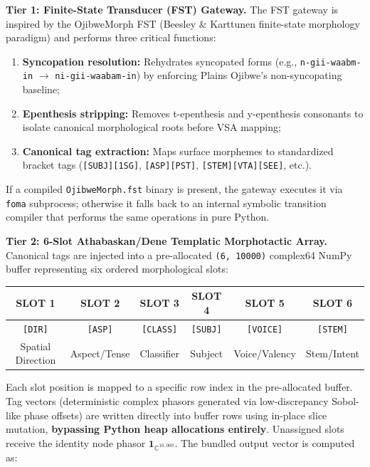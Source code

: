 \documentclass[11pt]{article}
\begin{document}
\textbf{Tier 1: Finite-State Transducer (FST) Gateway.} The FST gateway is inspired by the OjibweMorph FST (Beesley \& Karttunen finite-state morphology paradigm) and performs three critical functions:
\begin{enumerate}[label=(\alph*)]
    \item \textbf{Syncopation resolution:} Rehydrates syncopated forms (e.g., \texttt{n-gii-waabm-in} $\rightarrow$ \texttt{ni-gii-waabam-in}) by enforcing Plains Ojibwe's non-syncopating baseline;
    \item \textbf{Epenthesis stripping:} Removes t-epenthesis and y-epenthesis consonants to isolate canonical morphological roots before VSA mapping;
    \item \textbf{Canonical tag extraction:} Maps surface morphemes to standardized bracket tags (\texttt{[SUBJ][1SG]}, \texttt{[ASP][PST]}, \texttt{[STEM][VTA][SEE]}, etc.).
\end{enumerate}
If a compiled \texttt{OjibweMorph.fst} binary is present, the gateway executes it via \texttt{foma} subprocess; otherwise it falls back to an internal symbolic transition compiler that performs the same operations in pure Python.

\textbf{Tier 2: 6-Slot Athabaskan/Dene Templatic Morphotactic Array.} Canonical tags are injected into a pre-allocated \texttt{(6, 10000)} complex64 NumPy buffer representing six ordered morphological slots:

\begin{center}
\begin{tabular}{c|c|c|c|c|c}
\textbf{SLOT 1} & \textbf{SLOT 2} & \textbf{SLOT 3} & \textbf{SLOT 4} & \textbf{SLOT 5} & \textbf{SLOT 6} \\
\hline
\texttt{[DIR]} & \texttt{[ASP]} & \texttt{[CLASS]} & \texttt{[SUBJ]} & \texttt{[VOICE]} & \texttt{[STEM]} \\
Spatial Direction & Aspect/Tense & Classifier & Subject & Voice/Valency & Stem/Intent \\
\end{tabular}
\end{center}

Each slot position is mapped to a specific row index in the pre-allocated buffer. Tag vectors (deterministic complex phasors generated via low-discrepancy Sobol-like phase offsets) are written directly into buffer rows using in-place slice mutation, \textbf{bypassing Python heap allocations entirely}. Unassigned slots receive the identity node phasor $\mathbf{1}_{\mathbb{C}^{10{,}000}}$. The bundled output vector is computed as:
\end{document}
